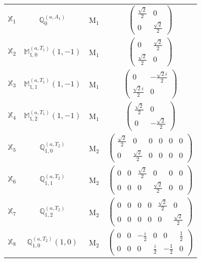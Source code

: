 \documentclass[fleqn,10pt,landscape]{article}
\begin{document}
\begin{itemize}
\begin{center}
\begin{longtable}{c|c|c|c}
$ \mathbb{X}_{1} $ & $\mathbb{Q}_{0}^{(a,A_{1})}$ & M$_{1}$ & $\begin{pmatrix} \frac{\sqrt{2}}{2} & 0 \\ 0 & \frac{\sqrt{2}}{2} \end{pmatrix}$ \\
$ \mathbb{X}_{2} $ & $\mathbb{M}_{1,0}^{(a,T_{1})}(1,-1)$ & M$_{1}$ & $\begin{pmatrix} 0 & \frac{\sqrt{2}}{2} \\ \frac{\sqrt{2}}{2} & 0 \end{pmatrix}$ \\
$ \mathbb{X}_{3} $ & $\mathbb{M}_{1,1}^{(a,T_{1})}(1,-1)$ & M$_{1}$ & $\begin{pmatrix} 0 & - \frac{\sqrt{2} i}{2} \\ \frac{\sqrt{2} i}{2} & 0 \end{pmatrix}$ \\
$ \mathbb{X}_{4} $ & $\mathbb{M}_{1,2}^{(a,T_{1})}(1,-1)$ & M$_{1}$ & $\begin{pmatrix} \frac{\sqrt{2}}{2} & 0 \\ 0 & - \frac{\sqrt{2}}{2} \end{pmatrix}$ \\ \hline
$ \mathbb{X}_{5} $ & $\mathbb{Q}_{1,0}^{(a,T_{2})}$ & M$_{2}$ & $\begin{pmatrix} \frac{\sqrt{2}}{2} & 0 & 0 & 0 & 0 & 0 \\ 0 & \frac{\sqrt{2}}{2} & 0 & 0 & 0 & 0 \end{pmatrix}$ \\
$ \mathbb{X}_{6} $ & $\mathbb{Q}_{1,1}^{(a,T_{2})}$ & M$_{2}$ & $\begin{pmatrix} 0 & 0 & \frac{\sqrt{2}}{2} & 0 & 0 & 0 \\ 0 & 0 & 0 & \frac{\sqrt{2}}{2} & 0 & 0 \end{pmatrix}$ \\
$ \mathbb{X}_{7} $ & $\mathbb{Q}_{1,2}^{(a,T_{2})}$ & M$_{2}$ & $\begin{pmatrix} 0 & 0 & 0 & 0 & \frac{\sqrt{2}}{2} & 0 \\ 0 & 0 & 0 & 0 & 0 & \frac{\sqrt{2}}{2} \end{pmatrix}$ \\
$ \mathbb{X}_{8} $ & $\mathbb{Q}_{1,0}^{(a,T_{2})}(1,0)$ & M$_{2}$ & $\begin{pmatrix} 0 & 0 & - \frac{i}{2} & 0 & 0 & \frac{1}{2} \\ 0 & 0 & 0 & \frac{i}{2} & - \frac{1}{2} & 0 \end{pmatrix}$ \\

\end{longtable}
\end{center}
\end{itemize}
\end{document}
